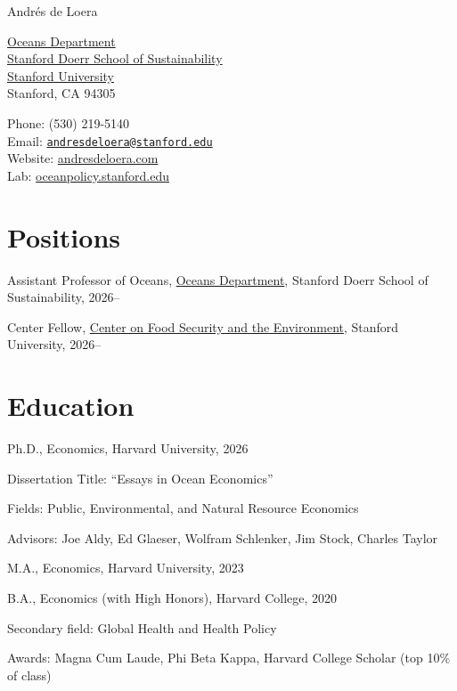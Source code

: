 \documentclass[10pt,letterpaper]{article}
\def\name{Andr\'es de Loera}
\renewenvironment{itemize}{
  \begin{list}{}{
    \setlength{\leftmargin}{1.5em}
    \setlength{\topsep}{3pt}
    \setlength{\itemsep}{3pt}
    \setlength{\parsep}{0pt}
  }
}{
  \end{list}
}
\begin{document}
{\huge \name}

\vspace{0.25in}

\begin{minipage}[t]{0.5\textwidth}
  \href{https://oceans.stanford.edu/}{Oceans Department} \\
  \href{https://sustainability.stanford.edu/}{Stanford Doerr School of Sustainability} \\
  \href{https://www.stanford.edu/}{Stanford University} \\
  Stanford, CA 94305
\end{minipage}
\begin{minipage}[t]{0.5\textwidth}
  Phone: (530) 219-5140 \\
  Email: \href{mailto:andresdeloera@stanford.edu}{\texttt{andresdeloera@stanford.edu}} \\
  Website: \href{https://www.andresdeloera.com/}{andresdeloera.com} \\
  Lab: \href{https://oceanpolicy.stanford.edu/}{oceanpolicy.stanford.edu}
\end{minipage}

\section*{Positions}
\begin{itemize}
  \item Assistant Professor of Oceans, \href{https://oceans.stanford.edu/}{Oceans Department}, Stanford Doerr School of Sustainability, 2026--
  \item Center Fellow, \href{https://fse.fsi.stanford.edu/}{Center on Food Security and the Environment}, Stanford University, 2026--
\end{itemize}

\section*{Education}
\begin{itemize}
  \item Ph.D., Economics, Harvard University, 2026
  \begin{itemize}
    \item Dissertation Title: ``Essays in Ocean Economics''
    \item Fields: Public, Environmental, and Natural Resource Economics
    \item Advisors: Joe Aldy, Ed Glaeser, Wolfram Schlenker, Jim Stock, Charles Taylor
  \end{itemize}
  \item M.A., Economics, Harvard University, 2023
  \item B.A., Economics (with High Honors), Harvard College, 2020
  \begin{itemize}
    \item Secondary field: Global Health and Health Policy
    \item Awards: Magna Cum Laude, Phi Beta Kappa, Harvard College Scholar (top 10\% of class)
  \end{itemize}
\end{itemize}
\end{document}
